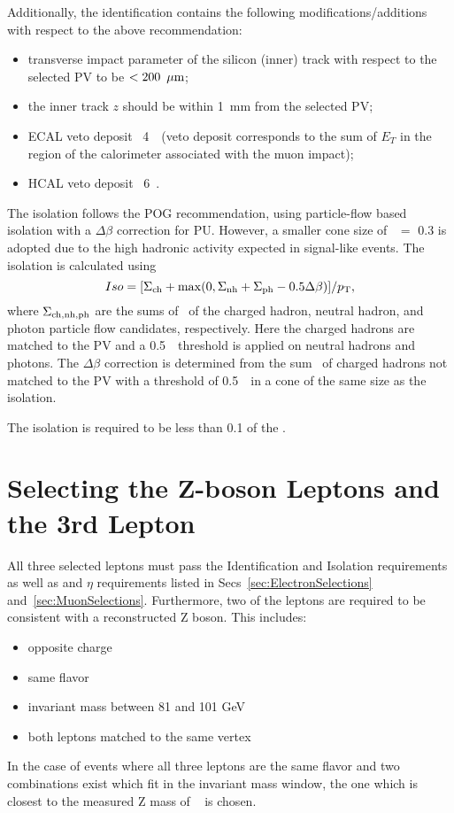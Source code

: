 Additionally, the identification contains the following modifications/additions with respect to the above recommendation:

\begin{itemize}
\item transverse impact parameter of the silicon (inner) track with respect to the selected PV to be $<200~\,\mu\text{m}$;
\item the inner track $z$ should be within 1~mm from the selected PV;
\item ECAL veto deposit \lt\ 4~\GeV\ (veto deposit corresponds to the sum of $E_T$ in the region of the calorimeter
associated with the muon impact);
\item HCAL veto deposit \lt\ 6~\GeV.
\end{itemize}

The isolation follows the POG recommendation, using particle-flow based isolation with a $\Delta\beta$ correction for PU.  
However, a smaller cone size of \DR\ $=$ 0.3 is adopted due to the high hadronic activity expected in signal-like events.  
The isolation is calculated using 
$$
Iso = [ \Sigma_{\rm ch} + {\rm max}(0, \Sigma_{\rm nh} + \Sigma_{\rm ph} - 0.5 \Delta\beta) ]/p_{\mathrm{T}},
$$
where $\Sigma_{\rm ch, nh, ph}$ are the sums of \pt\ of the charged hadron, neutral hadron, and photon particle flow candidates, respectively.
Here the charged hadrons are matched to the PV and a 0.5~\GeV\ threshold is applied on neutral hadrons and photons.  
The $\Delta\beta$ correction is determined from the sum \pt\ of charged hadrons not matched to the PV with a threshold of 0.5~\GeV\ in a cone of the same size as the isolation.  
 
The isolation is required to be less than 0.1 of the \pt.


\section{Selecting the Z-boson Leptons and the 3rd Lepton}
\label{sec:3LepSelection}
All three selected leptons must pass the Identification and Isolation requirements as well as \pt and $\eta$ requirements listed in Secs~\ref{sec:ElectronSelections} and~\ref{sec:MuonSelections}. Furthermore, two of the leptons are required to be consistent with a reconstructed Z boson. This includes:
\begin{itemize}
\item opposite charge
\item same flavor
\item invariant mass between 81 and 101 GeV
\item both leptons matched to the same vertex
\end{itemize}
In the case of events where all three leptons are the same flavor and two combinations exist which fit in the invariant mass window, the one which is closest to the measured Z mass of \zmass ~\cite{pdg} is chosen.\\

